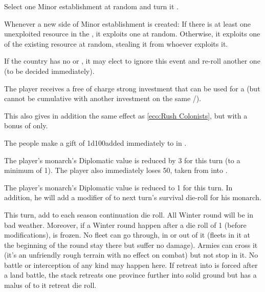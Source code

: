  Select one Minor establishment
\Facemoins at random and turn it \Faceplus.

 Whenever a new side of Minor
establishment is created:
\bparag If there is at least one unexploited resource in the \Area, it
exploits one at random.
\bparag Otherwise, it exploits one of the existing resource at random,
stealing it from whoever exploits it.




If the country has no \COLaction or \TPaction, it may elect to ignore this
event and re-roll another one (to be decided immediately).

The player receives a free of charge strong investment that can be used for a
\TFI (but cannot be cumulative with another investment on the same \STZ/\CTZ).

This also gives in addition the same effect as \ref{eco:Rush Colonists}, but
with a bonus of  only.




The people make a gift of 1d100\ducats added immediately to  in .




The player's monarch's Diplomatic value is reduced by 3 for this turn (to a
minimum of 1). The player also immediately loses 50\ducats, taken from
 into .




The player's monarch's Diplomatic value is reduced to 1 for this turn.  In
addition, he will add a modifier of  to next turn's survival
die-roll for his monarch.




\phmil
\aparag This turn, add  to each season continuation die roll. All
Winter round will be in bad weather.
 Moreover, if a Winter round happen after a die roll of 1
(before modifications), \seazoneOresund is frozen. No fleet can go through, in
or out of it (fleets in it at the beginning of the round stay there but suffer
no damage). Armies can cross it (it's an unfriendly rough terrain with no
effect on combat) but not stop in it. No battle or interception of any kind
may happen here. If retreat into \seazoneOresund is forced after a land
battle, the stack retreats one province further into solid ground but has a
malus of  to it retreat die roll.



